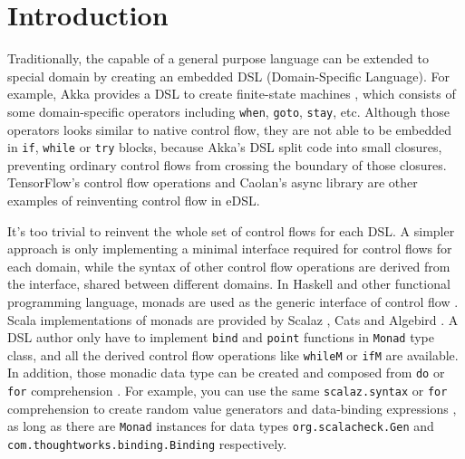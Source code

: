 \section{Introduction}
\label{introduction}

Traditionally, the capable of a general purpose language can be extended to special domain by creating an embedded DSL (Domain-Specific Language). For example, Akka provides a DSL to create finite-state machines \cite{lightbend2017akka}, which consists of some domain-specific operators including \lstinline{when}, \lstinline{goto}, \lstinline{stay}, etc. Although those operators looks similar to native control flow, they are not able to be embedded in \lstinline{if}, \lstinline{while} or \lstinline{try} blocks, because Akka's DSL split code into small closures, preventing ordinary control flows from crossing the boundary of those closures. TensorFlow's control flow operations \cite{abadi2016tensorflow} and Caolan's async library \cite{caolan2017async} are other examples of reinventing control flow in eDSL.

It's too trivial to reinvent the whole set of control flows for each DSL. A simpler approach is only implementing a minimal interface required for control flows for each domain, while the syntax of other control flow operations are derived from the interface, shared between different domains. In Haskell and other functional programming language, monads are used as the generic interface of control flow \cite{wadler1990comprehending,wadler1992essence,jones1993composing}. Scala implementations of monads are provided by Scalaz \cite{kenji2017scalaz}, Cats \cite{typelevel2017cats} and Algebird \cite{twitter2016algebird}. A DSL author only have to implement \lstinline{bind} and \lstinline{point} functions in \lstinline{Monad} type class, and all the derived control flow operations like \lstinline{whileM} or \lstinline{ifM} are available. In addition, those monadic data type can be created and composed from \lstinline{do} or \lstinline{for} comprehension \cite{jones1998haskell,odersky2004scala}. For example, you can use the same \lstinline{scalaz.syntax} or \lstinline{for} comprehension to create random value generators \cite{nilsson2015scalacheck} and data-binding expressions \cite{yangbo2016binding}, as long as there are \lstinline{Monad} instances for data types \lstinline{org.scalacheck.Gen} and \lstinline{com.thoughtworks.binding.Binding} respectively.

